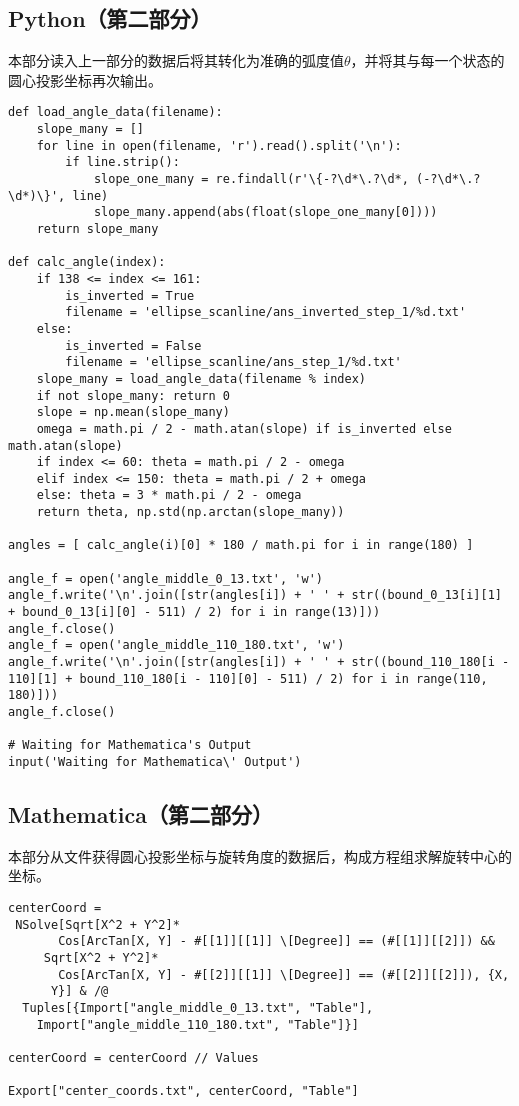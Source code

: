\subsection{Python（第二部分）}
本部分读入上一部分的数据后将其转化为准确的弧度值$\theta$，并将其与每一个状态的圆心投影坐标再次输出。
\begin{verbatim}
def load_angle_data(filename):
    slope_many = []
    for line in open(filename, 'r').read().split('\n'):
        if line.strip():
            slope_one_many = re.findall(r'\{-?\d*\.?\d*, (-?\d*\.?\d*)\}', line)
            slope_many.append(abs(float(slope_one_many[0])))
    return slope_many

def calc_angle(index):
    if 138 <= index <= 161:
        is_inverted = True
        filename = 'ellipse_scanline/ans_inverted_step_1/%d.txt'
    else:
        is_inverted = False
        filename = 'ellipse_scanline/ans_step_1/%d.txt'
    slope_many = load_angle_data(filename % index)
    if not slope_many: return 0
    slope = np.mean(slope_many)
    omega = math.pi / 2 - math.atan(slope) if is_inverted else math.atan(slope)
    if index <= 60: theta = math.pi / 2 - omega
    elif index <= 150: theta = math.pi / 2 + omega
    else: theta = 3 * math.pi / 2 - omega
    return theta, np.std(np.arctan(slope_many))

angles = [ calc_angle(i)[0] * 180 / math.pi for i in range(180) ]

angle_f = open('angle_middle_0_13.txt', 'w')
angle_f.write('\n'.join([str(angles[i]) + ' ' + str((bound_0_13[i][1] + bound_0_13[i][0] - 511) / 2) for i in range(13)]))
angle_f.close()
angle_f = open('angle_middle_110_180.txt', 'w')
angle_f.write('\n'.join([str(angles[i]) + ' ' + str((bound_110_180[i - 110][1] + bound_110_180[i - 110][0] - 511) / 2) for i in range(110, 180)]))
angle_f.close()

# Waiting for Mathematica's Output
input('Waiting for Mathematica\' Output')
\end{verbatim} 

\subsection{Mathematica（第二部分）}
本部分从文件获得圆心投影坐标与旋转角度的数据后，构成方程组求解旋转中心的坐标。
\begin{verbatim}
centerCoord =
 NSolve[Sqrt[X^2 + Y^2]*
       Cos[ArcTan[X, Y] - #[[1]][[1]] \[Degree]] == (#[[1]][[2]]) &&
     Sqrt[X^2 + Y^2]*
       Cos[ArcTan[X, Y] - #[[2]][[1]] \[Degree]] == (#[[2]][[2]]), {X,
      Y}] & /@
  Tuples[{Import["angle_middle_0_13.txt", "Table"],
    Import["angle_middle_110_180.txt", "Table"]}]
	
centerCoord = centerCoord // Values

Export["center_coords.txt", centerCoord, "Table"]
\end{verbatim}


